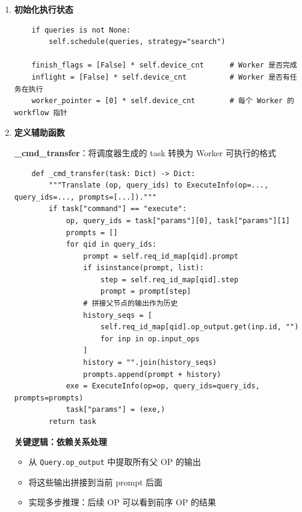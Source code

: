 \documentclass[12pt,a4paper]{article}
\begin{document}
\begin{enumerate}
    \item \textbf{初始化执行状态}
    \begin{lstlisting}
    if queries is not None:
        self.schedule(queries, strategy="search")
    
    finish_flags = [False] * self.device_cnt      # Worker 是否完成
    inflight = [False] * self.device_cnt          # Worker 是否有任务在执行
    worker_pointer = [0] * self.device_cnt        # 每个 Worker 的 workflow 指针
    \end{lstlisting}
    
    \item \textbf{定义辅助函数}
    
    \textbf{\_cmd\_transfer}：将调度器生成的 task 转换为 Worker 可执行的格式
    \begin{lstlisting}
    def _cmd_transfer(task: Dict) -> Dict:
        """Translate (op, query_ids) to ExecuteInfo(op=..., query_ids=..., prompts=[...])."""
        if task["command"] == "execute":
            op, query_ids = task["params"][0], task["params"][1]
            prompts = []
            for qid in query_ids:
                prompt = self.req_id_map[qid].prompt
                if isinstance(prompt, list):
                    step = self.req_id_map[qid].step
                    prompt = prompt[step]
                # 拼接父节点的输出作为历史
                history_seqs = [
                    self.req_id_map[qid].op_output.get(inp.id, "")
                    for inp in op.input_ops
                ]
                history = "".join(history_seqs)
                prompts.append(prompt + history)
            exe = ExecuteInfo(op=op, query_ids=query_ids, prompts=prompts)
            task["params"] = (exe,)
        return task
    \end{lstlisting}
    
    \textbf{关键逻辑：依赖关系处理}
    \begin{itemize}
        \item 从 \texttt{Query.op_output} 中提取所有父 OP 的输出
        \item 将这些输出拼接到当前 prompt 后面
        \item 实现多步推理：后续 OP 可以看到前序 OP 的结果
    \end{itemize}
    

\end{enumerate}
\end{document}
